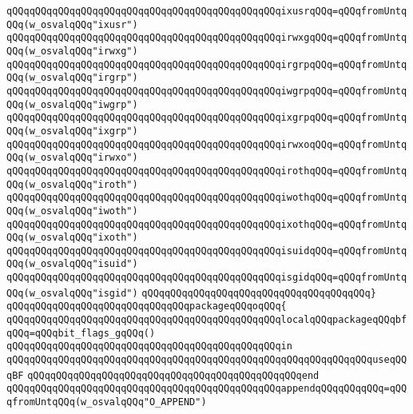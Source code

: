 \verb|qQQqqQQqqQQqqQQqqQQqqQQqqQQqqQQqqQQqqQQqqQQqqQQqixusrqQQq=qQQqfromUntqQQq(w_osvalqQQq"ixusr")|\newline
\verb|qQQqqQQqqQQqqQQqqQQqqQQqqQQqqQQqqQQqqQQqqQQqqQQqirwxgqQQq=qQQqfromUntqQQq(w_osvalqQQq"irwxg")|\newline
\verb|qQQqqQQqqQQqqQQqqQQqqQQqqQQqqQQqqQQqqQQqqQQqqQQqirgrpqQQq=qQQqfromUntqQQq(w_osvalqQQq"irgrp")|\newline
\verb|qQQqqQQqqQQqqQQqqQQqqQQqqQQqqQQqqQQqqQQqqQQqqQQqiwgrpqQQq=qQQqfromUntqQQq(w_osvalqQQq"iwgrp")|\newline
\verb|qQQqqQQqqQQqqQQqqQQqqQQqqQQqqQQqqQQqqQQqqQQqqQQqixgrpqQQq=qQQqfromUntqQQq(w_osvalqQQq"ixgrp")|\newline
\verb|qQQqqQQqqQQqqQQqqQQqqQQqqQQqqQQqqQQqqQQqqQQqqQQqirwxoqQQq=qQQqfromUntqQQq(w_osvalqQQq"irwxo")|\newline
\verb|qQQqqQQqqQQqqQQqqQQqqQQqqQQqqQQqqQQqqQQqqQQqqQQqirothqQQq=qQQqfromUntqQQq(w_osvalqQQq"iroth")|\newline
\verb|qQQqqQQqqQQqqQQqqQQqqQQqqQQqqQQqqQQqqQQqqQQqqQQqiwothqQQq=qQQqfromUntqQQq(w_osvalqQQq"iwoth")|\newline
\verb|qQQqqQQqqQQqqQQqqQQqqQQqqQQqqQQqqQQqqQQqqQQqqQQqixothqQQq=qQQqfromUntqQQq(w_osvalqQQq"ixoth")|\newline
\verb|qQQqqQQqqQQqqQQqqQQqqQQqqQQqqQQqqQQqqQQqqQQqqQQqisuidqQQq=qQQqfromUntqQQq(w_osvalqQQq"isuid")|\newline
\verb|qQQqqQQqqQQqqQQqqQQqqQQqqQQqqQQqqQQqqQQqqQQqqQQqisgidqQQq=qQQqfromUntqQQq(w_osvalqQQq"isgid")|\newline
\newline
\verb|qQQqqQQqqQQqqQQqqQQqqQQqqQQqqQQqqQQqqQQq}|\newline
\newline
\verb|qQQqqQQqqQQqqQQqqQQqqQQqqQQqqQQqpackageqQQqoqQQq{|\newline
\newline
\verb|qQQqqQQqqQQqqQQqqQQqqQQqqQQqqQQqqQQqqQQqqQQqqQQqlocalqQQqpackageqQQqbfqQQq=qQQqbit_flags_gqQQq()|\newline
\verb|qQQqqQQqqQQqqQQqqQQqqQQqqQQqqQQqqQQqqQQqqQQqqQQqin|\newline
\verb|qQQqqQQqqQQqqQQqqQQqqQQqqQQqqQQqqQQqqQQqqQQqqQQqqQQqqQQqqQQqqQQquseqQQqBF|\newline
\verb|qQQqqQQqqQQqqQQqqQQqqQQqqQQqqQQqqQQqqQQqqQQqqQQqend|\newline
\newline
\verb|qQQqqQQqqQQqqQQqqQQqqQQqqQQqqQQqqQQqqQQqqQQqqQQqappendqQQqqQQqqQQq=qQQqfromUntqQQq(w_osvalqQQq"O_APPEND")|\newline
